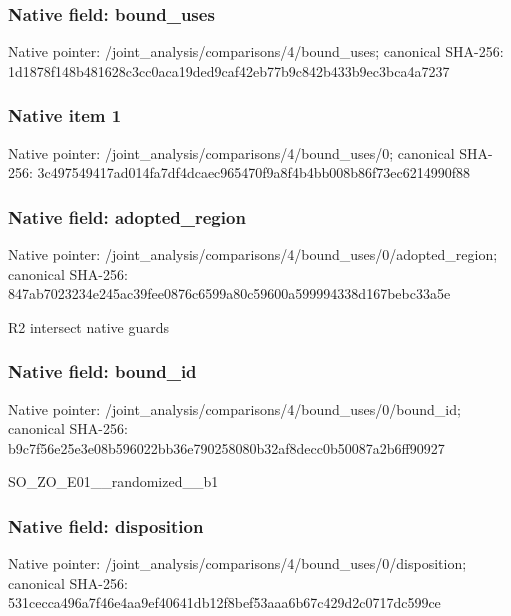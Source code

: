 \documentclass[10pt,a4paper]{article}
\begin{document}
\subsubsection{Native field: bound\_\allowbreak{}uses}
Native pointer: /joint\_\allowbreak{}analysis/comparisons/4/bound\_\allowbreak{}uses; canonical SHA-256: 1d1878f148b481628c3cc0aca19ded9caf42eb77b9c842b433b9ec3bca4a7237

\subsubsection{Native item 1}
Native pointer: /joint\_\allowbreak{}analysis/comparisons/4/bound\_\allowbreak{}uses/0; canonical SHA-256: 3c497549417ad014fa7df4dcaec965470f9a8f4b4bb008b86f73ec6214990f88

\subsubsection{Native field: adopted\_\allowbreak{}region}
Native pointer: /joint\_\allowbreak{}analysis/comparisons/4/bound\_\allowbreak{}uses/0/adopted\_\allowbreak{}region; canonical SHA-256: 847ab7023234e245ac39fee0876c6599a80c59600a599994338d167bebc33a5e

\begingroup\raggedright\sloppy R2 intersect native guards\par\endgroup

\subsubsection{Native field: bound\_\allowbreak{}id}
Native pointer: /joint\_\allowbreak{}analysis/comparisons/4/bound\_\allowbreak{}uses/0/bound\_\allowbreak{}id; canonical SHA-256: b9c7f56e25e3e08b596022bb36e790258080b32af8decc0b50087a2b6ff90927

\begingroup\raggedright\sloppy SO\_\allowbreak{}ZO\_\allowbreak{}E01\_\allowbreak{}\_\allowbreak{}randomized\_\allowbreak{}\_\allowbreak{}b1\par\endgroup

\subsubsection{Native field: disposition}
Native pointer: /joint\_\allowbreak{}analysis/comparisons/4/bound\_\allowbreak{}uses/0/disposition; canonical SHA-256: 531cecca496a7f46e4aa9ef40641db12f8bef53aaa6b67c429d2c0717dc599ce
\end{document}
